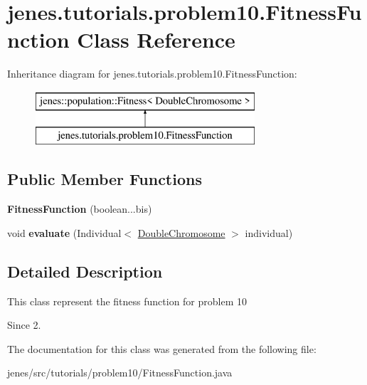 \hypertarget{classjenes_1_1tutorials_1_1problem10_1_1_fitness_function}{\section{jenes.\-tutorials.\-problem10.\-Fitness\-Function Class Reference}
\label{classjenes_1_1tutorials_1_1problem10_1_1_fitness_function}
}
Inheritance diagram for jenes.\-tutorials.\-problem10.\-Fitness\-Function\-:\begin{figure}[H]
\begin{center}
\leavevmode
\includegraphics[height=2.000000cm]{classjenes_1_1tutorials_1_1problem10_1_1_fitness_function}
\end{center}
\end{figure}
\subsection*{Public Member Functions}
\begin{DoxyCompactItemize}
\item 
\hypertarget{classjenes_1_1tutorials_1_1problem10_1_1_fitness_function_aeb6a9ecb4db8c351c339216b17a8567c}{{\bfseries Fitness\-Function} (boolean...\-bis)}\label{classjenes_1_1tutorials_1_1problem10_1_1_fitness_function_aeb6a9ecb4db8c351c339216b17a8567c}

\item 
\hypertarget{classjenes_1_1tutorials_1_1problem10_1_1_fitness_function_a54972d1a838b687a21cebd08be3b26b2}{void {\bfseries evaluate} (Individual$<$ \hyperlink{classjenes_1_1chromosome_1_1_double_chromosome}{Double\-Chromosome} $>$ individual)}\label{classjenes_1_1tutorials_1_1problem10_1_1_fitness_function_a54972d1a838b687a21cebd08be3b26b2}

\end{DoxyCompactItemize}


\subsection{Detailed Description}
This class represent the fitness function for problem 10

\begin{DoxySince}{Since}
2. 
\end{DoxySince}


The documentation for this class was generated from the following file\-:\begin{DoxyCompactItemize}
\item 
jenes/src/tutorials/problem10/Fitness\-Function.\-java\end{DoxyCompactItemize}
